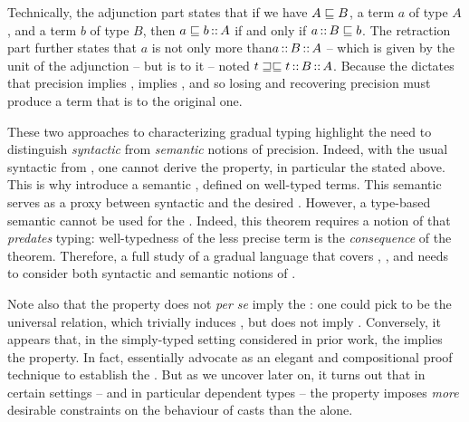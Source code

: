 Technically, the adjunction part states that if we have $A \sqsubseteq B$, a term $a$ of type $A$,
and a term $b$ of type $B$, then $a \sqsubseteq b \operatorname{\mathord{:}:} A$ if and only if $a \operatorname{\mathord{:}:} B \sqsubseteq b$.
%
\AP The retraction part further states that $a$ is not only more 
than$a \operatorname{\mathord{:}:} B \operatorname{\mathord{:}:} A$ – which is given by the unit of the adjunction –
but is  to it – noted $t \sqsupseteq\sqsubseteq t \operatorname{\mathord{:}:} B \operatorname{\mathord{:}:} A$.
Because the  dictates that precision implies ,
 implies ,
and so losing and recovering precision must produce a term that is  to the original one.

\AP These two approaches to characterizing gradual typing highlight
the need to distinguish
\emph{syntactic} from \emph{semantic} notions of precision.
Indeed, with the usual syntactic  from ,
one cannot derive the  property, in particular the  stated above.
This is why  introduce a semantic ,
defined on well-typed terms. This semantic  serves
as a proxy between syntactic  and the desired
.
%
However, a type-based semantic  cannot be used for the .
Indeed, this theorem%
requires a notion of  that \emph{predates} typing:
well-typedness of the less precise term is the \emph{consequence} of the theorem. 
Therefore, a full study of a gradual language that covers , , and
 needs to consider both syntactic and semantic
notions of .

Note also that the  property does not
\textit{per se} imply the : one could pick  to be the universal relation,
which trivially induces , but does not imply .
Conversely, it appears that, in the simply-typed setting considered in prior work,
the  implies the  property.
In fact, \textcite{New2018} essentially advocate  as an elegant and compositional
proof technique to establish the .
But as we uncover later on, it turns out that in certain settings – and in particular dependent types – the  property imposes \emph{more}
desirable constraints on the behaviour of casts than the  alone.


